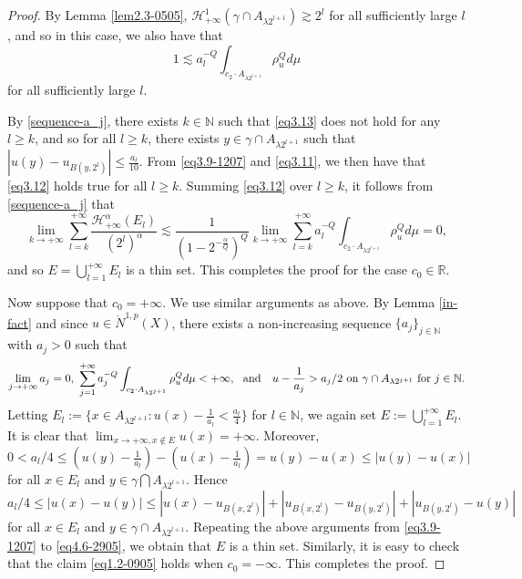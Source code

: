 \documentclass[10pt]{amsart}
\numberwithin{equation}{section}
\newcommand{\N}{\mathbb{N}}
\begin{document}
\begin{proof}
  By Lemma \ref{lem2.3-0505}, $\mathcal H^{1}_{+\infty} (\gamma\cap A_{\lambda 2^{l+1}})\gtrsim 2^{l}$ for all sufficiently large $l$, and so in this case, we also have that 	
	 \begin{equation}
	 		\label{eq3.13} 1\lesssim  a_l^{-Q}\int_{c_2\cdot A_{\lambda 2^{l+1}}}\rho_u^Qd\mu
	 \end{equation} 
  for all sufficiently large $l$.
  
  By \eqref{sequence-a_j}, there exists $k\in\N$ such that \eqref{eq3.13} does not  hold for any $l\geq k$, and so for all $l\ge k$, there exists $y\in\gamma\cap A_{\lambda 2^{l+1}}$ such that $|u(y)-u_{B(y,2^l)}|\le\frac{a_l}{10}$.  From \eqref{eq3.9-1207} and \eqref{eq3.11}, we then have that \eqref{eq3.12} holds true for all $l\geq k$. 
	  	Summing \eqref{eq3.12}  over $l\geq k$, it follows from \eqref{sequence-a_j} that
	 			\begin{equation}\label{eq4.6-2905}
	 		\lim_{k\to{+\infty}}\sum_{l=k}^{+\infty}
	 		 \frac{\mathcal H^{\alpha}_{{+\infty}}(E_l)}{(2^{l})^\alpha}\lesssim  \frac{1}{(1-2^{-\frac{\alpha}{Q}})^Q}  \lim_{k\to{+\infty}}\sum_{l=k}^{+\infty} a_l^{-Q}\int_{c_2\cdot A_{\lambda 2^{l+1}}}\rho_u^Qd\mu=0,
	 			\end{equation}
	 		and so $E=\bigcup_{l=1}^{+\infty} E_l$ is a thin set. This completes the proof for the case $c_0\in\mathbb R$.
	
	Now suppose that $c_0=+\infty$.  We use similar arguments as above.  By Lemma \ref{in-fact} and since $u\in \dot N^{1,p}(X)$, there exists a non-increasing sequence $\{a_j\}_{j\in\mathbb N}$ with $a_j>0$ such that 
	\[
		\lim_{j\to+\infty}a_j=0, \ \sum_{j=1}^{+\infty} a_j^{-Q}\int_{c_2\cdot A_{\lambda 2^{j+1}}}\rho_u^Qd\mu<+\infty, \text{\rm \ \ and \ \  $u-\frac{1}{a_j}>a_{j}/2$ on  $\gamma\cap A_{\lambda 2^{j+1}}$ for $j\in\mathbb N$}.
	\]
Letting $E_{l}:=\{x\in A_{\lambda 2^{l+1}}: u(x)-\frac{1}{a_l}< \frac{a_l}{4}\}$ for $l\in\mathbb N$,  we again set $E:=\bigcup_{l=1}^{+\infty}E_l$. It is clear that $\lim_{x\to+\infty, x\notin E}u(x)=+\infty$. Moreover, $0<a_l/4\leq (u(y)-\frac{1}{a_l}) - (u(x)-\frac{1}{a_l})=u(y)-u(x)\leq |u(y)-u(x)|$ for all $x\in E_l$ and $y\in \gamma\bigcap A_{\lambda 2^{l+1}}$. Hence 
	\[
	a_l/4\leq |u(x)-u(y)| \leq | u(x)-u_{B(x,2^l)}|+|u_{B(x,2^l)}-u_{B(y,2^l)}|+|u_{B(y,2^l)}-u(y)|
 	\]
  for all $x\in E_l$ and $y\in  \gamma\cap A_{\lambda 2^{l+1}}$. Repeating the above arguments from \eqref{eq3.9-1207} to \eqref{eq4.6-2905}, we obtain that $E$ is a thin set. 
Similarly, it is easy to check that the  claim \eqref{eq1.2-0905} holds when $c_0=-\infty$. This completes the proof.
\end{proof}
\end{document}
